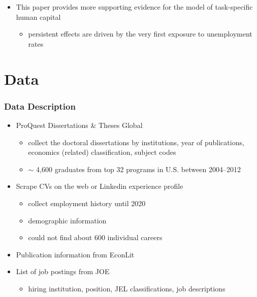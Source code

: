 \documentclass[10pt,svgnames,fragile]{beamer}
\begin{document}
{{\begin{frame}
\begin{itemize}
\vfill
		\item This paper provides more supporting evidence for the model of task-specific human capital 
		\begin{itemize}
			\vspace{1.5 mm}
			\item  persistent effects are driven by the very first exposure to unemployment rates
		\end{itemize}		
\vfill
	\end{itemize}
\end{frame}
}}


{
	\AtBeginSection{}
\section{Data}
\begin{frame}[label=Data]
	\frametitle{Data Description}
		\begin{itemize}
			\item ProQuest Dissertations \& Theses Global
			\begin{itemize}
				\vspace{1 mm}
				\item collect the doctoral dissertations by institutions, year of publications, economics (related) classification, subject codes
				\vspace{1 mm}
				\item $\sim$ 4,600 graduates from top 32 programs in U.S. between 2004--2012 
			\end{itemize}
\vfill
			\item Scrape CVs on the web or Linkedin experience profile
			\begin{itemize}
				\vspace{1 mm}
				\item collect employment history until 2020
				\vspace{1 mm}
				\item demographic information
				\vspace{1 mm}
				\item could not find about 600 individual careers
			\end{itemize}
\vfill
			\item Publication information from EconLit
\vfill
			\item List of job postings from JOE
			\begin{itemize}
				\vspace{1 mm}
				\item hiring institution, position, JEL classifications, job descriptions  
			\end{itemize}		
			

\end{itemize}
\end{frame}}
\end{document}

